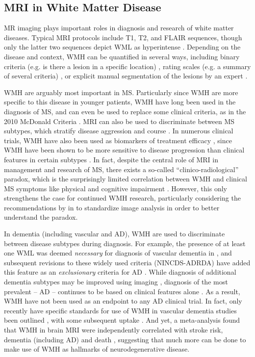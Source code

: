 \subsection{MRI in White Matter Disease}
MR imaging plays important roles in diagnosis and research of white matter diseases.
Typical MRI protocols include T1, T2, and FLAIR sequences, though only the latter two sequences depict WML as hyperintense \cite{Simon2006,Wardlaw2013}.
Depending on the disease and context, WMH can be quantified in several ways, including binary criteria (e.g. is there a lesion in a  specific location) \cite{Polman2011,Roman1993}, rating scales (e.g. a summary of several criteria) \cite{Fazekas1987}, or explicit manual segmentation of the lesions by an expert \cite{Egger2017}.
\par
WMH are arguably most important in MS.
Particularly since WMH are more specific to this disease in younger patients, WMH have long been used in the diagnosis of MS, and can even be used to replace some clinical criteria, as in the 2010 McDonald Criteria \cite{Polman2011}.
MRI can also be used to discriminate between MS subtypes, which stratify disease aggression and course \cite{Polman2011,Lublin2014,Traboulsee2015}.
In numerous clinical trials, WMH have also been used as biomarkers of treatment efficacy \cite{Sormani2013,Fahrbach2013,Ziemssen2015}, since WMH have been shown to be more sensitive to disease progression than clinical features in certain subtypes \cite{ORiordan1998}.
In fact, despite the central role of MRI in management and research of MS, there exists a so-called ``clinico-radiological'' paradox, which is the surprisingly limited correlation between WMH and clinical MS symptoms like physical and cognitive impairment \cite{Mollison2017}.
However, this only strengthens the case for continued WMH research, particularly considering the recommendations by \citeauthor{Mollison2017} in \cite{Mollison2017} to standardize image analysis in order to better understand the paradox.
\par
In dementia (including vascular and AD), WMH are used to discriminate between disease subtypes during diagnosis.
For example, the presence of at least one WML was deemed \textit{necessary} for diagnosis of vascular dementia in \citeyear{Roman1993} \cite{Roman1993}, and subsequent revisions to these widely used criteria (NINCDS-ADRDA) have added this feature as an \textit{exclusionary} criteria for AD \cite{Dubois2007}.
While diagnosis of additional dementia subtypes may be improved using imaging \cite{Sorbi2012,Verhagen2016}, diagnosis of the most prevalent -- AD -- continues to be based on clinical features alone \cite{McKhann2011}.
As a result, WMH have not been used as an endpoint to any AD clinical trial.
In fact, only recently have specific standards for use of WMH in vascular dementia studies been outlined \cite{Wardlaw2013,Wardlaw2015}, with some subsequent uptake \cite{VanWesten2016}.
And yet, a \citeyear{Debette2010} meta-analysis found that WMH in brain MRI were independently correlated with stroke risk, dementia (including AD) and death \cite{Debette2010}, suggesting that much more can be done to make use of WMH as hallmarks of neurodegenerative disease.
